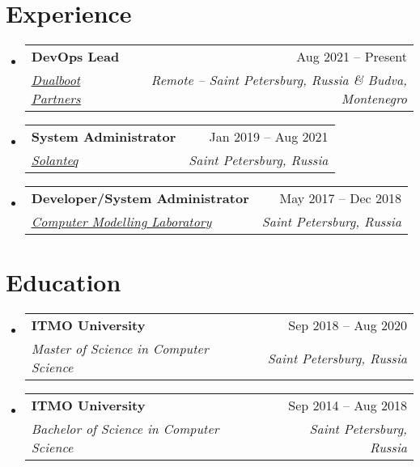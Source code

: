\documentclass[a4paper,11pt]{article}
\makeatletter
\newcommand{\resumeItem}[1]{
  \item\small{#1}
}
\newcommand{\resumeItemListStart}{\begin{itemize}[rightmargin=0.11in]}
\newcommand{\resumeItemListEnd}{\end{itemize}}
\newcommand{\resumeQuadHeading}[4]{
  \item
  \begin{tabular*}{0.96\textwidth}[t]{l@{\extracolsep{\fill}}r}
    \textbf{#1} & #2 \\
    \textit{\small#3} & \textit{\small #4} \\
  \end{tabular*}
}
\newcommand{\resumeHeadingListStart}{
  \begin{itemize}[leftmargin=0.15in, label={}]
}
\newcommand{\resumeHeadingListEnd}{\end{itemize}}
\makeatother
\begin{document}

\section{Experience}
\resumeHeadingListStart{}
  \resumeQuadHeading{DevOps Lead}{Aug 2021 -- Present}
  {\href{https://www.linkedin.com/company/dualbootpartners/}{\uline{Dualboot Partners}}}{Remote -- Saint Petersburg, Russia \& Budva, Montenegro}

  \resumeQuadHeading{System Administrator}{Jan 2019 -- Aug 2021}
  {\href{https://www.linkedin.com/company/solanteq/}{\uline{Solanteq}}}{Saint Petersburg, Russia}

  \resumeQuadHeading{Developer/System Administrator}{May 2017 -- Dec 2018}{\href{https://sim-lab.ru}{\uline{Computer Modelling Laboratory}}}{Saint Petersburg, Russia}
\resumeHeadingListEnd{}



\section{Education}
  \resumeHeadingListStart{}
    \resumeQuadHeading{ITMO University}{Sep 2018 -- Aug 2020}
    {Master of Science in Computer Science}{Saint Petersburg, Russia}
    \resumeQuadHeading{ITMO University}{Sep 2014 -- Aug 2018}
    {Bachelor of Science in Computer Science}{Saint Petersburg, Russia}
  \resumeHeadingListEnd{}
\end{document}

